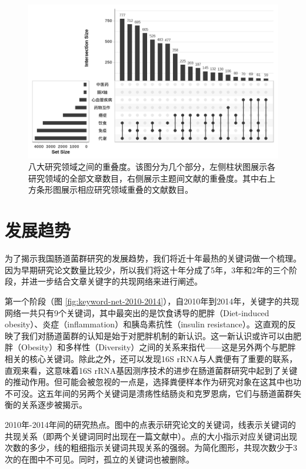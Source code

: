 \documentclass[]{ctexbook}
\begin{document}
\begin{figure}
\includegraphics[width=1\linewidth]{plots/china-topic-upsetR-1} \caption{八大研究领域之间的重叠度。该图分为几个部分，左侧柱状图展示各研究领域的全部文章数目，右侧展示主题间文献的重叠度。其中右上方条形图展示相应研究领域重叠的文献数目。}\label{fig:china-topic-upsetR}
\end{figure}

\hypertarget{ux53d1ux5c55ux8d8bux52bf}{%
\section{发展趋势}\label{ux53d1ux5c55ux8d8bux52bf}}

为了揭示我国肠道菌群研究的发展趋势，我们将近十年最热的关键词做一个梳理。因为早期研究论文数量比较少，所以我们将这十年分成了5年，3年和2年的三个阶段，并进一步结合文章关键字的共现网络来进行阐述。

第一个阶段（图 \ref{fig:keyword-net-2010-2014}），自2010年到2014年，关键字的共现网络一共只有9个关键词，其中最突出的是饮食诱导的肥胖（Diet-induced obesity）、炎症（inflammation）和胰岛素抗性（insulin resistance）。这直观的反映了我们对肠道菌群的认知是始于对肥胖机制的新认识。这一新认识或许可以由肥胖（Obesity）和多样性（Diversity）之间的关系来指代------这是另外两个与肥胖相关的核心关键词。除此之外，还可以发现16S rRNA与人粪便有了重要的联系，直观来看，这意味着16S rRNA基因测序技术的进步在肠道菌群研究中起到了关键的推动作用。但可能会被忽视的一点是，选择粪便样本作为研究对象在这其中也功不可没。这五年间的另两个关键词是溃疡性结肠炎和克罗恩病，它们与肠道菌群失衡的关系逐步被揭示。

\hypertarget{htmlwidget-bfc0412ee330fc39f701}{}

\label{fig:keyword-net-2010-2014} 2010年-2014年间的研究热点。图中的点表示研究论文的关键词，线表示关键词的共现关系（即两个关键词同时出现在一篇文献中）。点的大小指示对应关键词出现次数的多少，线的粗细指示关键词共现关系的强弱。为简化图形，共现次数少于3次的在图中不可见。同时，孤立的关键词也被删除。
\end{document}
